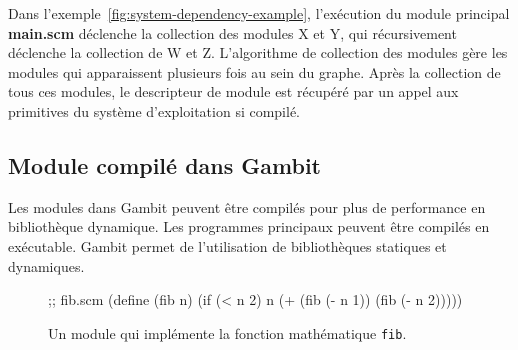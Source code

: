 Dans l'exemple~\ref{fig:system-dependency-example}, l'exécution du module principal
\textbf{main.scm} déclenche la collection des modules X et Y, qui récursivement
déclenche la collection de W et Z.  L'algorithme de collection des modules gère
les modules qui apparaissent plusieurs fois au sein du graphe.  Après la
collection de tous ces modules, le descripteur de module est
récupéré par un appel aux primitives du système d'exploitation si compilé.


\subsection{Module compilé dans Gambit}

Les modules dans Gambit peuvent être compilés pour plus de performance en
bibliothèque dynamique. Les programmes principaux peuvent être compilés en
exécutable.  Gambit permet de l'utilisation de bibliothèques statiques et
dynamiques.\\

\begin{figure}[ht]
  \centering

  \begin{mplisting}{0.5}
;; fib.scm
(define (fib n)
  (if (< n 2)
      n
      (+ (fib (- n 1))
         (fib (- n 2)))))
\end{mplisting}
  \caption{Un module qui implémente la fonction mathématique \texttt{fib}.}
  \label{fig:basic_fib_module}
\end{figure}

